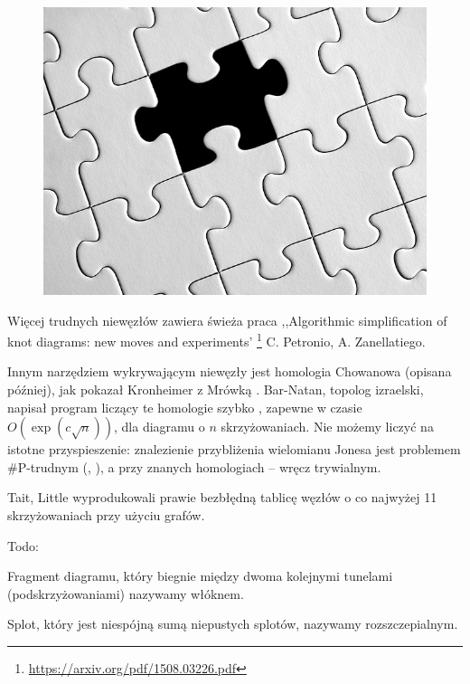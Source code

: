 \begin{figure}[H]
\begin{minipage}[b]{.32\linewidth}
		\includegraphics[width=\linewidth]{../data/missing.jpg}
	\end{minipage}
\end{figure}

Więcej trudnych niewęzłów zawiera świeża praca
,,Algorithmic simplification of knot diagrams: new moves and experiments'
\footnote{\url{https://arxiv.org/pdf/1508.03226.pdf}}
C. Petronio, A. Zanellatiego.

Innym narzędziem wykrywającym niewęzły jest homologia Chowanowa (opisana później),
jak pokazał Kronheimer z Mrówką \cite{kronheimer11}.
Bar-Natan, topolog izraelski, napisał program liczący te homologie szybko \cite{barnatan07},
zapewne w czasie $O(\exp(c \sqrt n))$, dla diagramu o $n$ skrzyżowaniach.
Nie możemy liczyć na istotne przyspieszenie:
znalezienie przybliżenia wielomianu Jonesa jest problemem \#P-trudnym (\cite{kuperberg15}, \cite{vertigan05}),
a przy znanych homologiach -- wręcz trywialnym.

Tait, Little wyprodukowali prawie bezbłędną tablicę węzłów o co najwyżej 11 skrzyżowaniach przy użyciu grafów.

Todo:
\begin{definition}[włókno]
	Fragment diagramu, który biegnie między dwoma kolejnymi tunelami (podskrzyżowaniami) nazywamy włóknem.
\end{definition}

\begin{definition}[rozszczepialność]
	Splot, który jest niespójną sumą niepustych splotów, nazywamy rozszczepialnym.
\end{definition}